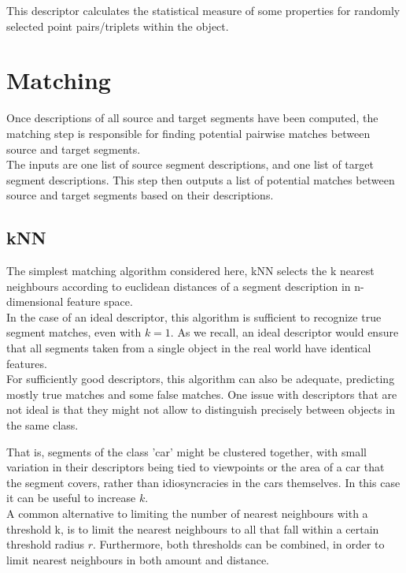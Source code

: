 This descriptor calculates the statistical measure of some properties for randomly selected point pairs/triplets within the object.\\

\section{Matching}
\label{sec:matching}

Once descriptions of all source and target segments have been computed, the matching step is responsible for finding potential pairwise matches between source and target segments.\\ 

The inputs are one list of source segment descriptions, and one list of target segment descriptions. This step then outputs a list of potential matches between source and target segments based on their descriptions.\\

\subsection{kNN}
\label{subsec:kNN}

The simplest matching algorithm considered here, kNN selects the k nearest neighbours according to euclidean distances of a segment description in n-dimensional feature space.\\

In the case of an ideal descriptor, this algorithm is sufficient to recognize true segment matches, even with $k = 1$. As we recall, an ideal descriptor would ensure that all segments taken from a single object in the real world have identical features.\\ 

For sufficiently good descriptors, this algorithm can also be adequate, predicting mostly true matches and some false matches. One issue with descriptors that are not ideal is that they might not allow to distinguish precisely between objects in the same class.

That is, segments of the class 'car' might be clustered together, with small variation in their descriptors being tied to viewpoints or the area of a car that the segment covers, rather than idiosyncracies in the cars themselves. In this case it can be useful to increase $k$.\\

A common alternative to limiting the number of nearest neighbours with a threshold k, is to limit the nearest neighbours to all that fall within a certain threshold radius $r$. Furthermore, both thresholds can be combined, in order to limit nearest neighbours in both amount and distance.\\

